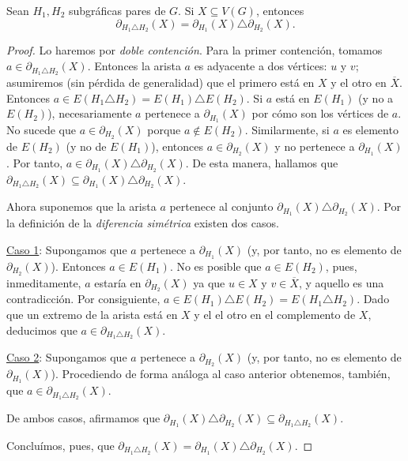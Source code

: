 \begin{prop} \label{prop2}
Sean $H_{1}, H_{2}$ subgráficas pares de $G$. Si $X \subseteq V(G)$, entonces 
$$
\partial_{H_{1} \triangle H_{2}}(X) = \partial_{H_{1}}(X) \triangle \partial_{H_{2}}(X).
$$
\end{prop}

\begin{proof} Lo haremos por \textit{doble contención}. Para la primer contención, tomamos $a \in \partial_{H_{1} \triangle H_{2}}(X)$. Entonces la arista $a$ es adyacente a dos vértices: $u$ y $v$; asumiremos (sin pérdida de generalidad) que el primero está en $X$ y el otro en $\overline{X}$. Entonces $a \in E(H_{1} \triangle H_{2})=E(H_{1}) \triangle E(H_{2})$. Si $a$ está en $E(H_{1})$ (y no a $E(H_{2})$), necesariamente $a$ pertenece a $\partial_{H_{1}}(X)$ por cómo son los vértices de $a$. No sucede que $a \in \partial_{H_{2}}(X)$ porque $a \notin E(H_{2})$. Similarmente, si $a$ es elemento de $E(H_{2})$ (y no de $E(H_{1})$), entonces $a \in \partial_{H_{2}}(X)$ y no pertenece a $\partial_{H_{1}}(X)$. Por tanto, $a \in \partial_{H_{1}}(X) \triangle \partial_{H_{2}}(X)$. De esta manera, hallamos que $\partial_{H_{1} \triangle H_{2}}(X) \subseteq \partial_{H_{1}}(X) \triangle \partial_{H_{2}}(X)$.

Ahora suponemos que la arista $a$ pertenece al conjunto $\partial_{H_{1}}(X) \triangle \partial_{H_{2}}(X)$. Por la definición de la \textit{diferencia simétrica} existen dos casos.

\underline{Caso 1}: Supongamos que $a$ pertenece a $\partial_{H_{1}}(X)$ (y, por tanto, no es elemento de $\partial_{H_{2}}(X)$). Entonces $a \in E(H_{1})$. No es posible que $a \in E(H_{2})$, pues, inmeditamente, $a$ estaría en $\partial_{H_{2}}(X)$ ya que $u \in X$ y $v \in \overline{X}$, y aquello es una contradicción. Por consiguiente, $a \in E(H_{1}) \triangle E(H_{2}) = E(H_{1} \triangle H_{2})$. Dado que un extremo de la arista está en $X$ y el el otro en el complemento de $X$, deducimos que $a \in \partial_{H_{1} \triangle H_{2}}(X)$.

\underline{Caso 2}: Supongamos que $a$ pertenece a $\partial_{H_{2}}(X)$ (y, por tanto, no es elemento de $\partial_{H_{1}}(X)$). Procediendo de forma análoga al caso anterior obtenemos, también, que $a \in \partial_{H_{1} \triangle H_{2}}(X)$.

De ambos casos, afirmamos que $\partial_{H_{1}}(X) \triangle \partial_{H_{2}}(X) \subseteq \partial_{H_{1} \triangle H_{2}}(X)$.

Concluímos, pues, que $\partial_{H_{1} \triangle H_{2}}(X) = \partial_{H_{1}}(X) \triangle \partial_{H_{2}}(X)$.

\end{proof}


